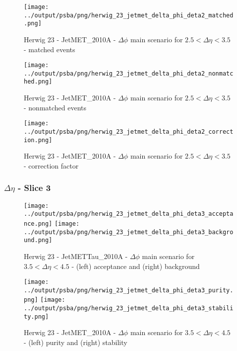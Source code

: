 \documentclass[11pt]{book}
\begin{document}
\begin{figure}[ht]
\centering
\texttt{[image: ../output/psba/png/herwig\_23\_jetmet\_delta\_phi\_deta2\_matched.png]}
\caption{Herwig 23 - JetMET\_2010A - $\Delta\phi$ main scenario for $2.5 < \Delta\eta < 3.5$ - matched events}
\label{fig:hw_23_jetmet_delta_phi_deta2_matched}
\end{figure}

\begin{figure}[ht]
\centering
\texttt{[image: ../output/psba/png/herwig\_23\_jetmet\_delta\_phi\_deta2\_nonmatched.png]}
\caption{Herwig 23 - JetMET\_2010A - $\Delta\phi$ main scenario for $2.5 < \Delta\eta < 3.5$ - nonmatched events}
\label{fig:hw_23_jetmet_delta_phi_deta2_nonmatched}
\end{figure}

\begin{figure}[ht]
\centering
\texttt{[image: ../output/psba/png/herwig\_23\_jetmet\_delta\_phi\_deta2\_correction.png]}
\caption{Herwig 23 - JetMET\_2010A - $\Delta\phi$ main scenario for $2.5 < \Delta\eta < 3.5$ - correction factor}
\label{fig:hw_23_jetmet_delta_phi_deta2_correction}
\end{figure}

\clearpage
\subsubsection{$\Delta\eta$ - Slice 3}

\begin{figure}[ht]
\centering
\texttt{[image: ../output/psba/png/herwig\_23\_jetmet\_delta\_phi\_deta3\_acceptance.png]}
\texttt{[image: ../output/psba/png/herwig\_23\_jetmet\_delta\_phi\_deta3\_background.png]}
\caption{Herwig 23 - JetMETTau\_2010A - $\Delta\phi$ main scenario for $3.5 < \Delta\eta < 4.5$ - (left) acceptance and (right) background}
\label{fig:hw_23_jetmet_delta_phi_deta3_ab}
\end{figure}

\begin{figure}[ht]
\centering
\texttt{[image: ../output/psba/png/herwig\_23\_jetmet\_delta\_phi\_deta3\_purity.png]}
\texttt{[image: ../output/psba/png/herwig\_23\_jetmet\_delta\_phi\_deta3\_stability.png]}
\caption{Herwig 23 - JetMET\_2010A - $\Delta\phi$ main scenario for $3.5 < \Delta\eta < 4.5$ - (left) purity and (right) stability}
\label{fig:p6_jetmet_delta_phi_deta3_ps}
\end{figure}
\end{document}
